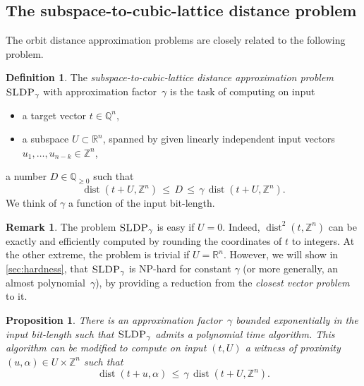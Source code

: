 \documentclass[10pt,a4paper]{article}
\newtheorem{proposition}[theorem]{Proposition}
\theoremstyle{definition}
\newtheorem{definition}[theorem]{Definition}
\newtheorem{remark}[theorem]{Remark}
\DeclareMathOperator{\dist}{dist}
\newcommand{\QQ}{\mathbb{Q}}
\newcommand{\ZZ}{\mathbb{Z}}
\newcommand{\RR}{\mathbb{R}}
\numberwithin{equation}{section}
\begin{document}
\subsection{The subspace-to-cubic-lattice distance problem}\label{sec:sldp-and-rop}
The orbit distance approximation problems are closely related to the following problem.

\begin{definition}
\label{def:gapsldp}
The {\em subspace-to-cubic-lattice distance approximation problem} $\textsc{SLDP}_\gamma$
with approximation factor~$\gamma$
is the task of computing on input
\begin{itemize}
\item a target vector $t\in\QQ^n$,
\item a subspace $U\subset\RR^n$, spanned by given linearly independent input vectors
   $u_1,\dots,u_{n-k}\in\ZZ^n$,
\end{itemize}
a number $D\in\QQ_{\geq 0}$ such that
\[
 \dist(t+U,\ZZ^n)\, \leq \, D \, \leq \, \gamma \, \dist(t+U,\ZZ^n).
\]
We think of $\gamma$ a function of the input bit-length.
\end{definition}


\begin{remark}
The problem $\textsc{SLDP}_\gamma$ is easy if $U=0$.
Indeed, $\dist^2(t,\ZZ^n)$ can be exactly and efficiently computed by rounding
the coordinates of $t$ to integers.
At the other extreme, the problem is trivial if $U=\RR^n$.
However, we will show in \cref{sec:hardness}, that $\textsc{SLDP}_\gamma$ is
\textsc{NP}-hard for constant $\gamma$ (or more generally, an almost polynomial~$\gamma$),
by providing a reduction from the \textit{closest vector problem} to it.
\end{remark}

\begin{proposition}\label{thm:sldp-is-in-p}
There is an approximation factor~$\gamma$ bounded exponentially in the input bit-length such that $\textsc{SLDP}_\gamma$ admits a polynomial time algorithm.
This algorithm can be modified to compute
on input $(t,U)$ a witness of proximity
$(u,\alpha)\in U\times\ZZ^n$ such that
\begin{equation*}%
  \dist(t+u,\alpha) \, \leq \, \gamma\, \dist(t+U,\ZZ^n).
\end{equation*}
\end{proposition}
\end{document}
